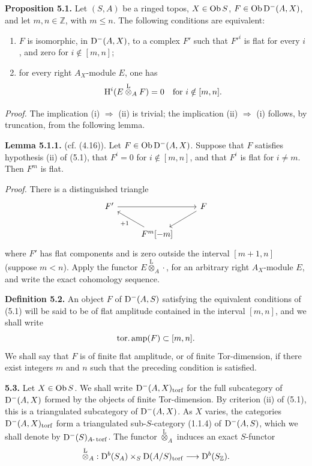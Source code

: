 \documentclass[11pt]{article}
\begin{document}
\textbf{Proposition 5.1.} Let \((S,A)\) be a ringed topos, \(X\in\operatorname{Ob} S\), \(F\in\operatorname{Ob}\mathrm D^-(A,X)\), and let \(m,n\in\mathbb Z\), with \(m\leq n\). The following conditions are equivalent:
\begin{enumerate}[label=(\roman*)]
\item \(F\) is isomorphic, in \(\mathrm D^-(A,X)\), to a complex \(F'\) such that \(F'^i\) is flat for every \(i\), and zero for \(i\notin[m,n]\);
\item for every right \(A_X\)-module \(E\), one has
\[
  \mathrm H^i(E\overset{\mathrm L}{\otimes}_A F)=0\quad\text{for }i\notin[m,n].
\]
\end{enumerate}

\emph{Proof.} The implication (i) \(\Rightarrow\) (ii) is trivial; the implication (ii) \(\Rightarrow\) (i) follows, by truncation, from the following lemma.

\textbf{Lemma 5.1.1.} (cf. (4.16)). Let \(F\in\operatorname{Ob}\mathrm D^-(A,X)\). Suppose that \(F\) satisfies hypothesis (ii) of (5.1), that \(F^i=0\) for \(i\notin[m,n]\), and that \(F^i\) is flat for \(i\ne m\). Then \(F^m\) is flat.

\emph{Proof.} There is a distinguished triangle
\[
\begin{tikzcd}
F' \arrow[rr] && F \arrow[dl]\\
& F^m[-m] \arrow[ul,"+1"] &
\end{tikzcd}
\]
where \(F'\) has flat components and is zero outside the interval \([m+1,n]\) (suppose \(m<n\)). Apply the functor \(E\overset{\mathrm L}{\otimes}_A\cdot\), for an arbitrary right \(A_X\)-module \(E\), and write the exact cohomology sequence.

\textbf{Definition 5.2.} An object \(F\) of \(\mathrm D^-(A,S)\) satisfying the equivalent conditions of (5.1) will be said to be of flat amplitude contained in the interval \([m,n]\), and we shall write
\[
  \operatorname{tor.amp}(F)\subset[m,n].
\]
We shall say that \(F\) is of finite flat amplitude, or of finite Tor-dimension, if there exist integers \(m\) and \(n\) such that the preceding condition is satisfied.

\textbf{5.3.} Let \(X\in\operatorname{Ob} S\). We shall write \(\mathrm D^-(A,X)_{\operatorname{torf}}\) for the full subcategory of \(\mathrm D^-(A,X)\) formed by the objects of finite Tor-dimension. By criterion (ii) of (5.1), this is a triangulated subcategory of \(\mathrm D^-(A,X)\). As \(X\) varies, the categories \(\mathrm D^-(A,X)_{\operatorname{torf}}\) form a triangulated sub-\(S\)-category (1.1.4) of \(\mathrm D^-(A,S)\), which we shall denote by \(\mathrm D^-(S)_{A\text{-}\operatorname{torf}}\). The functor \(\overset{\mathrm L}{\otimes}_A\) induces an exact \(S\)-functor
\[
  \overset{\mathrm L}{\otimes}_A:
  \mathrm D^b(S_A)\times_S \mathrm D(A/S)_{\operatorname{torf}}
  \longrightarrow \mathrm D^b(S_{\mathbb Z}).
\]
\end{document}
